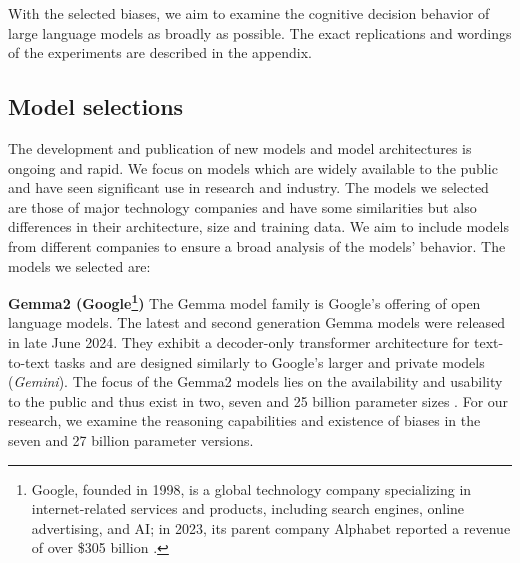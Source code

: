 \setlength{\parindent}{0pt}
\par With the selected biases, we aim to examine the cognitive decision behavior of large language models as broadly as possible. The exact replications and wordings of the experiments are described in the appendix.


\subsection{Model selections}
\par The development and publication of new models and model architectures is ongoing and rapid. We focus on models which are widely available to the public and have seen significant use in research and industry. The models we selected are those of major technology companies and have some similarities but also differences in their architecture, size and training data. We aim to include models from different companies to ensure a broad analysis of the models' behavior. The models we selected are:

\setlength{\parindent}{20pt}
\par \textbf{Gemma2 (Google\footnote{Google, founded in 1998, is a global technology company specializing in internet-related services and products, including search engines, online advertising, and AI; in 2023, its parent company Alphabet reported a revenue of over \$305 billion \parencite{alphabet2023annual}.})} The Gemma model family is Google's offering of open language models. The latest and second generation Gemma models were released in late June 2024. They exhibit a decoder-only transformer architecture for text-to-text tasks and are designed similarly to Google's larger and private models (\textit{Gemini}). The focus of the Gemma2 models lies on the availability and usability to the public and thus exist in two, seven and 25 billion parameter sizes \parencite{team2024gemma}. For our research, we examine the reasoning capabilities and existence of biases in the seven and 27 billion parameter versions.

